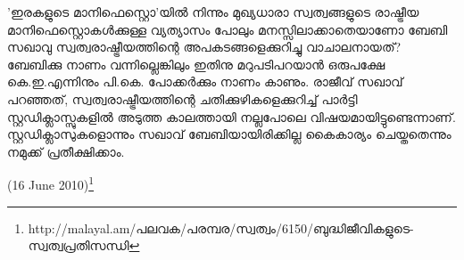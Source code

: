 'ഇരകളുടെ മാനിഫെസ്റ്റൊ'യില്‍ നിന്നും മുഖ്യധാരാ സ്വത്വങ്ങളുടെ രാഷ്ട്രീയ മാനിഫെസ്റ്റൊകള്‍ക്കുള്ള വ്യത്യാസം പോലും 
മനസ്സിലാക്കാതെയാണോ ബേബി സഖാവു സ്വത്വരാഷ്ട്രീയത്തിന്റെ അപകടങ്ങളെക്കുറിച്ചു വാചാലനായത്? ബേബിക്കു 
നാണം വന്നില്ലെങ്കിലും ഇതിനു മറുപടിപറയാന്‍ ഒരുപക്ഷേ കെ.ഇ.എന്നിനും പി.കെ. പോക്കര്‍ക്കും നാണം കാണും. 
രാജീവ് സഖാവ് പറഞ്ഞത്, സ്വത്വരാഷ്ട്രീയത്തിന്റെ ചതിക്കുഴികളെക്കുറിച്ച് പാര്‍ട്ടി സ്റ്റഡിക്ലാസ്സുകളില്‍ അടുത്ത 
കാലത്തായി നല്ലപോലെ വിഷയമായിട്ടുണ്ടെന്നാണ്. സ്റ്റഡിക്ലാസുകളൊന്നും സഖാവ് ബേബിയായിരിക്കില്ല കൈകാര്യം 
ചെയ്തതെന്നും നമുക്ക് പ്രതീക്ഷിക്കാം.

(16 June 2010)\footnote{http://malayal.am/പലവക/പരമ്പര/സ്വത്വം/6150/ബുദ്ധിജീവികളുടെ-സ്വത്വപ്രതിസന്ധി}

\newpage
